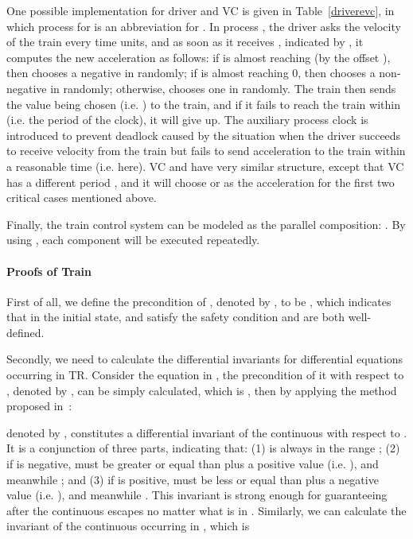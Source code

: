\documentclass{llncs}
\begin{document}
One possible implementation for driver and VC is given in Table~\ref{driverevc}, in which
process  for  is an abbreviation for
. In process
, the driver asks the velocity of the train every  time units, and as soon as
it receives , indicated by , it computes the new acceleration as follows:
 if  is almost reaching  (by the offset ), then chooses a negative
in  randomly; if
 is almost reaching 0, then chooses a non-negative in   randomly;
otherwise, chooses one in  randomly.
 The train then sends the value being chosen (i.e. ) to the train, and if it fails to reach the train
within  (i.e. the period of the clock), it will give up. The auxiliary process
\textsf{clock} is introduced to prevent deadlock caused by the situation when the driver succeeds to receive velocity  from the train but fails to send acceleration  to the train within a reasonable time (i.e.  here).
\textsf{VC}  and  have very similar structure, except that
\textsf{VC} has a different period , and it
will choose  or  as the acceleration for the first two critical cases mentioned above.

Finally, the train control system can be modeled
as the  parallel composition:
.
By using ,  each component will be executed repeatedly.

\paragraph{\textbf{Proofs of Train}}
\label{subsec:proof}
First of all,
we  define the precondition of , denoted by , to be
, which indicates that
in the initial state,  and  satisfy the safety condition and are both well-defined.

Secondly, we need to calculate the differential invariants for differential equations occurring in \textsf{TR}.
Consider the equation in ,
the precondition of it with respect to , denoted by , can be simply calculated, which is , then
by applying the method proposed in~\cite{LZZ11}:

denoted by , constitutes a differential invariant of the continuous with respect to .
It is a conjunction of three parts, indicating that:
(1)  is always in the range ;  (2) if  is negative, 
must be greater or equal than  plus  a positive value (i.e. ), and meanwhile ;
and (3) if  is positive,
  must be less or equal than  plus a negative value (i.e. ), and meanwhile .
This invariant is strong enough for guaranteeing   after the continuous escapes no matter what 
is in .
Similarly, we can calculate the invariant of the continuous occurring in , which is
\end{document}
